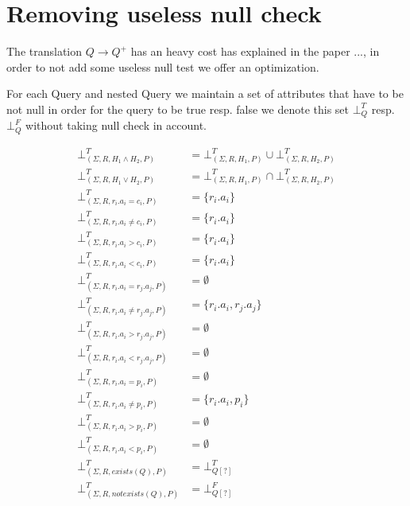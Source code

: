 \section{Removing useless null check}
The translation $Q \rightarrow Q^+$ has an heavy cost has explained in the paper ..., in order to not add some useless null test we offer an optimization.
\begin{mydef}
For each Query and nested Query we maintain a set of attributes that have to be not null in order for the query to be true resp. false we denote this set $\bot^T_{Q}$ resp.$\bot^F_{Q}$ without taking null check in account.
\end{mydef} 

\begin{mydef}
	\begin{align*}
		\bot^T_{(\Sigma,R,H_1 \land H_2,P)} & = \bot^T_{(\Sigma,R,H_1,P)} \cup \bot^T_{(\Sigma,R,H_2,P)} \\
		\bot^T_{(\Sigma,R,H_1 \lor H_2,P)} & = \bot^T_{(\Sigma,R,H_1,P)} \cap \bot^T_{(\Sigma,R,H_2,P)} \\
		\bot^T_{(\Sigma,R,r_i.a_i = c_i,P)} & = \{r_i.a_i\} \\
		\bot^T_{(\Sigma,R,r_i.a_i \neq c_i,P)} & = \{r_i.a_i\} \\
		\bot^T_{(\Sigma,R,r_i.a_i > c_i,P)} & = \{r_i.a_i\} \\
		\bot^T_{(\Sigma,R,r_i.a_i < c_i,P)} & = \{r_i.a_i\} \\
		\bot^T_{(\Sigma,R,r_i.a_i = r_j.a_j,P)} & = \emptyset \\
		\bot^T_{(\Sigma,R,r_i.a_i \neq r_j.a_j,P)} & = \{r_i.a_i,r_j.a_j\} \\
		\bot^T_{(\Sigma,R,r_i.a_i > r_j.a_j,P)} & = \emptyset \\
		\bot^T_{(\Sigma,R,r_i.a_i < r_j.a_j,P)} & = \emptyset \\
		\bot^T_{(\Sigma,R,r_i.a_i = p_i,P)} & = \emptyset \\
		\bot^T_{(\Sigma,R,r_i.a_i \neq p_i,P)} & = \{r_i.a_i,p_i\} \\
		\bot^T_{(\Sigma,R,r_i.a_i > p_i,P)} & = \emptyset \\
		\bot^T_{(\Sigma,R,r_i.a_i < p_i,P)} & = \emptyset \\
		\bot^T_{(\Sigma,R,exists(Q),P)} & = \bot^T_{Q[?]} \\
		\bot^T_{(\Sigma,R,notexists(Q),P)} & = \bot^F_{Q[?]}\\
	\end{align*}
	

\end{mydef}

